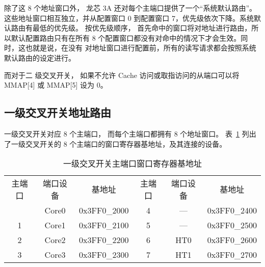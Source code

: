 除了这 8 个地址窗口外， 龙芯 3A 还对每个主端口提供了一个``系统默认路由''。
这些地址窗口相互独立，并从配置窗口 0 到配置窗口
7，优先级依次下降。系统默认路由有最低的优先级。 按优先级顺序，
首先命中的窗口将对地址进行路由，所以默认配置路由只有在所有 8
个配置窗口都没有对命中的情况下才会生效。同时，这也就是说，在没有
对地址窗口进行配置前，所有的读写请求都会按照系统默认路由的设定进行。

而对于二 级交叉开关， 如果不允许 Cache 访问或取指访问的从端口可以将 MMAP[4] 或
MMAP[5] 设为 0。

\subsection{一级交叉开关地址路由}

一级交叉开关对应 8 个主端口， 而每个主端口都拥有 8 个地址窗口。
表~\ref{tab:X1MasterWinBases} 列出了一级交叉开关的 8
个主端口的窗口寄存器基地址，及其连接的设备。
\begin{table}[htbp]
  \centering
  \begin{tabular}{|c|c|c||c|c|c|} \hline
    主端口 & 端口设备 & 基地址       & 主端口 & 端口设备 & 基地址       \\ \hhline
    0      & Core0    & 0x3FF0\_2000 & 4      & ---      & 0x3FF0\_2400 \\ 
    1      & Core1    & 0x3FF0\_2100 & 5      & ---      & 0x3FF0\_2500 \\ 
    2      & Core2    & 0x3FF0\_2200 & 6      & HT0      & 0x3FF0\_2600 \\ 
    3      & Core3    & 0x3FF0\_2300 & 7      & HT1      & 0x3FF0\_2700 \\ \hline
  \end{tabular}
  \caption{一级交叉开关主端口窗口寄存器基地址}
  \label{tab:X1MasterWinBases}
\end{table}

